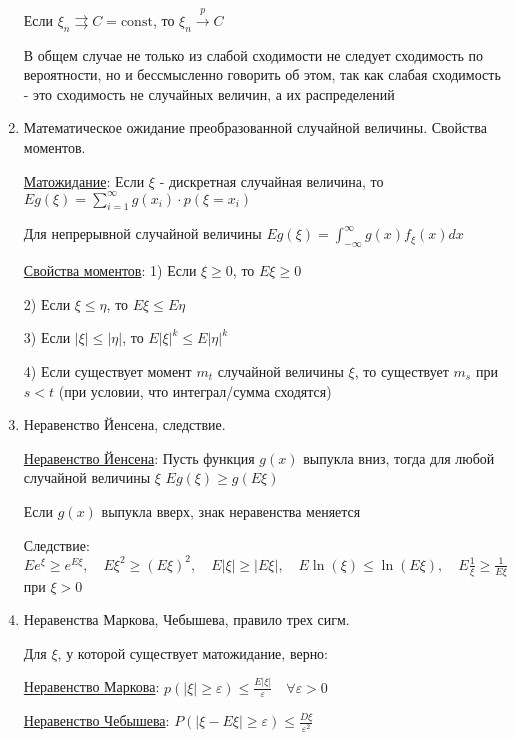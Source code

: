 \documentclass[12pt]{article}
\begin{document}
\begin{enumerate}
    \Ths Если $\xi_n \rightrightarrows C = \mathrm{const}$, то $\xi_n \overset{p}{\longrightarrow} C$

    \Nota В общем случае не только из слабой сходимости не следует сходимость по вероятности, но и бессмысленно говорить
    об этом, так как слабая сходимость - это сходимость не случайных величин, а их распределений

    \item Математическое ожидание преобразованной случайной величины. Свойства моментов.
    
    \hyperlink{expectedvalueoftransformedvariable}{Матожидание}: \Ths Если $\xi$ - дискретная случайная величина, то $Eg(\xi) = \sum_{i = 1}^\infty g(x_i) \cdot p(\xi = x_i)$

    Для непрерывной случайной величины $Eg(\xi) = \int_{-\infty}^{\infty} g(x) f_\xi(x) dx$

    \hyperlink{momentsproperties}{Свойства моментов}: 1) Если $\xi \geq 0$, то $E\xi \geq 0$

    2) Если $\xi \leq \eta$, то $E\xi \leq E\eta$

    3) Если $|\xi| \leq |\eta|$, то $E|\xi|^k \leq E|\eta|^k$

    4) Если существует момент $m_t$ случайной величины $\xi$, то существует $m_s$ при $s < t$ (при условии, что интеграл/сумма сходятся)

    
    \item Неравенство Йенсена, следствие.

    \hyperlink{jensensinequality}{Неравенство Йенсена}: \Ths Пусть функция $g(x)$ выпукла вниз, тогда для любой случайной величины $\xi$ $Eg(\xi) \geq g(E\xi)$

    \Nota Если $g(x)$ выпукла вверх, знак неравенства меняется

    Следствие: $Ee^\xi \geq e^{E\xi}, \quad E\xi^2 \geq (E\xi)^2, \quad E|\xi| \geq |E\xi|, \quad E\ln(\xi) \leq \ln(E\xi), \quad E\frac{1}{\xi} \geq \frac{1}{E\xi}$ при $\xi > 0$

    \item Неравенства Маркова, Чебышева, правило трех сигм.

    Для $\xi$, у которой существует матожидание, верно: 

    \hyperlink{markovsinequality}{Неравенство Маркова}: \Ths $p(|\xi| \geq \varepsilon) \leq \frac{E|\xi|}{\varepsilon} \quad \forall \varepsilon > 0$
    
    \hyperlink{chebyshevsinequality}{Неравенство Чебышева}: \Ths $P(|\xi - E\xi| \geq \varepsilon) \leq \frac{D\xi}{\varepsilon^2}$
    

\end{enumerate}
\end{document}
